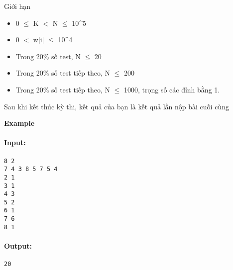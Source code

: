 Giới hạn
\begin{itemize}
	\item     0  $\le$  K $<$ N  $\le$  10^5   
	\item     0 $<$ w[i]  $\le$  10^4   
	\item     Trong 20\% số test, N  $\le$  20   
	\item     Trong 20\% số test tiếp theo, N  $\le$  200   
	\item     Trong 20\% số test tiếp theo, N  $\le$  1000, trọng số các đỉnh bằng 1.   
\end{itemize}

    Sau khi kết thúc kỳ thi, kết quả của bạn là kết quả lần nộp bài cuối cùng   

\textbf{}
\textbf{    Example
}

\paragraph{   Input:  }
\begin{verbatim}
8 2
7 4 3 8 5 7 5 4
2 1
3 1
4 3
5 2
6 1
7 6
8 1\end{verbatim}

\paragraph{   Output:  }
\begin{verbatim}
20\end{verbatim}